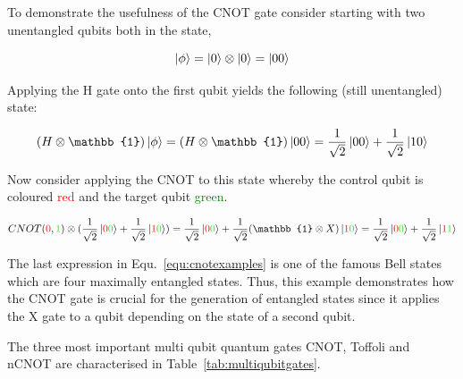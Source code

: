 To demonstrate the usefulness of the CNOT gate consider starting with two unentangled qubits both in the \0 state,

\begin{equation}
\ket{\phi} = \ket{0} \otimes \ket{0} = \ket{00}
\end{equation}

Applying the H gate onto the first qubit yields the following (still unentangled) state:

\begin{equation}
(H \otimes \mathbb{1}) \ket{\phi} = (H \otimes \mathbb{1}) \ket{00} = \frac{1}{\sqrt{2}} \ket{00} + \frac{1}{\sqrt{2}} \ket{10} 
\end{equation}

Now consider applying the CNOT to this state whereby the control qubit is coloured \textcolor{red}{red} and the target qubit \textcolor{green}{green}.

\begin{equation}
\label{equ:cnotexamples}
CNOT(\textcolor{red}{0},\textcolor{green}{1}) \otimes (\frac{1}{\sqrt{2}} \ket{\textcolor{red}{0}\textcolor{green}{0}} + \frac{1}{\sqrt{2}} \ket{\textcolor{red}{1}\textcolor{green}{0}}) = \frac{1}{\sqrt{2}} \ket{\textcolor{red}{0}\textcolor{green}{0}} + \frac{1}{\sqrt{2}} (\mathbb{1} \otimes X) \ket{\textcolor{red}{1}\textcolor{green}{0}} = \frac{1}{\sqrt{2}} \ket{\textcolor{red}{0}\textcolor{green}{0}} + \frac{1}{\sqrt{2}} \ket{\textcolor{red}{1}\textcolor{green}{1}}
\end{equation}

The last expression in Equ.~\ref{equ:cnotexamples} is one of the famous Bell states which are four maximally entangled states. Thus, this example demonstrates how the CNOT gate is crucial for the generation of entangled states since it applies the X gate to a qubit depending on the state of a second qubit.

The three most important multi qubit quantum gates CNOT, Toffoli and nCNOT are characterised in Table~\ref{tab:multiqubitgates}.

